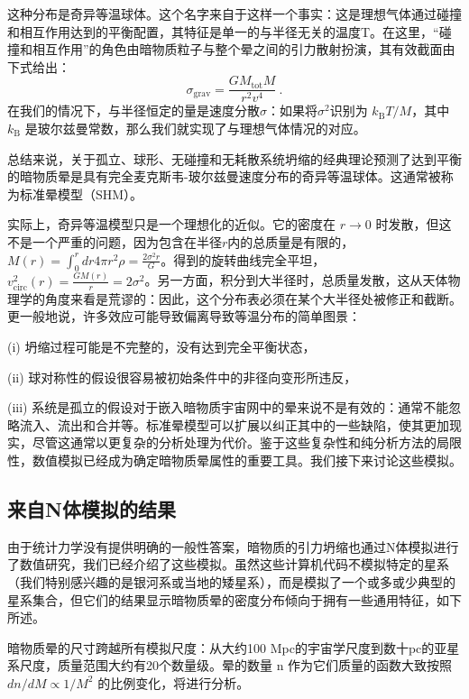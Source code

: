 这种分布是奇异等温球体。这个名字来自于这样一个事实：这是理想气体通过碰撞和相互作用达到的平衡配置，其特征是单一的与半径无关的温度T。在这里，“碰撞和相互作用”的角色由暗物质粒子与整个晕之间的引力散射扮演，其有效截面由下式给出：
\begin{equation}
\sigma_{\text{grav}} = \frac{G M_{\text{tot}} M}{r^2 v^4}~. 
\end{equation}
在我们的情况下，与半径恒定的量是速度分散$\sigma$：如果将$\sigma^2$识别为 \( k_{\text{B}} T/M \)，其中 \( k_{\text{B}} \) 是玻尔兹曼常数，那么我们就实现了与理想气体情况的对应。

总结来说，关于孤立、球形、无碰撞和无耗散系统坍缩的经典理论预测了达到平衡的暗物质晕是具有完全麦克斯韦-玻尔兹曼速度分布的奇异等温球体。这通常被称为标准晕模型（SHM）。

实际上，奇异等温模型只是一个理想化的近似。它的密度在 \( r \to 0 \) 时发散，但这不是一个严重的问题，因为包含在半径$r$内的总质量是有限的，\( M(r) = \int_0^r dr 4\pi r^2 \rho = \frac{2\sigma^2 r}{G} \)。得到的旋转曲线完全平坦，\( v_{\text{circ}}^2(r) = \frac{G M(r)}{r} = 2\sigma^2 \)。另一方面，积分到大半径时，总质量发散，这从天体物理学的角度来看是荒谬的：因此，这个分布表必须在某个大半径处被修正和截断。更一般地说，许多效应可能导致偏离导致等温分布的简单图景：

(i) 坍缩过程可能是不完整的，没有达到完全平衡状态，

(ii) 球对称性的假设很容易被初始条件中的非径向变形所违反，

(iii) 系统是孤立的假设对于嵌入暗物质宇宙网中的晕来说不是有效的：通常不能忽略流入、流出和合并等。标准晕模型可以扩展以纠正其中的一些缺陷，使其更加现实，尽管这通常以更复杂的分析处理为代价。鉴于这些复杂性和纯分析方法的局限性，数值模拟已经成为确定暗物质晕属性的重要工具。我们接下来讨论这些模拟。

\subsection{来自N体模拟的结果}

由于统计力学没有提供明确的一般性答案，暗物质的引力坍缩也通过N体模拟进行了数值研究，我们已经介绍了这些模拟。虽然这些计算机代码不模拟特定的星系（我们特别感兴趣的是银河系或当地的矮星系），而是模拟了一个或多或少典型的星系集合，但它们的结果显示暗物质晕的密度分布倾向于拥有一些通用特征，如下所述。

暗物质晕的尺寸跨越所有模拟尺度：从大约100 Mpc的宇宙学尺度到数十pc的亚星系尺度，质量范围大约有20个数量级。晕的数量 n 作为它们质量的函数大致按照 \( dn/dM \propto 1/M^2 \) 的比例变化，将进行分析。

